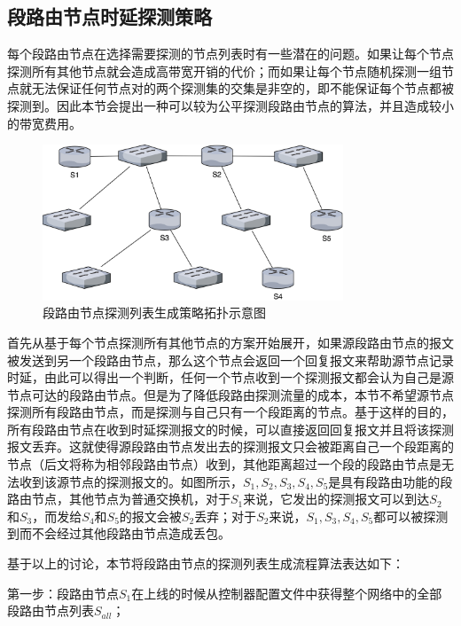 \subsection{段路由节点时延探测策略}

每个段路由节点在选择需要探测的节点列表时有一些潜在的问题。如果让每个节点探测所有其他节点就会造成高带宽开销的代价；而如果让每个节点随机探测一组节点就无法保证任何节点对的两个探测集的交集是非空的，即不能保证每个节点都被探测到。因此本节会提出一种可以较为公平探测段路由节点的算法，并且造成较小的带宽费用。

\begin{figure}[htbp]
\setlength{\abovecaptionskip}{15pt plus 3pt minus 2pt}
\centerline{\includegraphics[width=0.8\textwidth]{./figures/ch4-random-topo.png}}
\caption{段路由节点探测列表生成策略拓扑示意图}
\label{fig-ch4-random-topo}
\end{figure}

首先从基于每个节点探测所有其他节点的方案开始展开，如果源段路由节点的报文被发送到另一个段路由节点，那么这个节点会返回一个回复报文来帮助源节点记录时延，由此可以得出一个判断，任何一个节点收到一个探测报文都会认为自己是源节点可达的段路由节点。但是为了降低段路由探测流量的成本，本节不希望源节点探测所有段路由节点，而是探测与自己只有一个段距离的节点。基于这样的目的，所有段路由节点在收到时延探测报文的时候，可以直接返回回复报文并且将该探测报文丢弃。这就使得源段路由节点发出去的探测报文只会被距离自己一个段距离的节点（后文将称为相邻段路由节点）收到，其他距离超过一个段的段路由节点是无法收到该源节点的探测报文的。如图所示，${S_1, S_2, S_3, S_4, S_5}$是具有段路由功能的段路由节点，其他节点为普通交换机，对于$S_1$来说，它发出的探测报文可以到达$S_2$和$S_3$，而发给$S_4$和$S_5$的报文会被$S_2$丢弃；对于$S_2$来说，$S_1, S_3, S_4, S_5$都可以被探测到而不会经过其他段路由节点造成丢包。

基于以上的讨论，本节将段路由节点的探测列表生成流程算法表达如下：

第一步：段路由节点$S_1$在上线的时候从控制器配置文件中获得整个网络中的全部段路由节点列表$S_{all}$；

